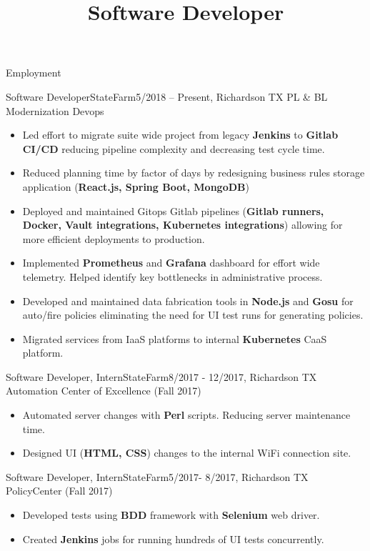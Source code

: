 \documentclass[]{lau}
\title{Software Developer}
\begin{document}
	\makeheader

	\begin{cvsection}{Employment}
		\begin{cvsubsection}{Software Developer}{StateFarm}{5/2018 – Present, Richardson TX}
			PL \& BL Modernization Devops
			\begin{itemize}
				\item Led effort to migrate suite wide project from legacy \textbf{Jenkins} to \textbf{Gitlab CI/CD} reducing pipeline complexity and decreasing test cycle time.
				\item Reduced planning time by factor of days by redesigning business rules storage application (\textbf{React.js, Spring Boot, MongoDB})
				\item Deployed and maintained Gitops Gitlab pipelines (\textbf{Gitlab runners, Docker, Vault integrations, Kubernetes integrations}) allowing for more efficient deployments to production.
				\item Implemented \textbf{Prometheus} and \textbf{Grafana} dashboard for effort wide telemetry. Helped identify key bottlenecks in administrative process.
				\item Developed and maintained data fabrication tools in \textbf{Node.js} and \textbf{Gosu} for auto/fire policies eliminating the need for UI test runs for generating policies.
				\item Migrated services from IaaS platforms to internal \textbf{Kubernetes} CaaS platform.
			\end{itemize}
		\end{cvsubsection}

		\begin{cvsubsection}{Software Developer, Intern}{StateFarm}{8/2017 - 12/2017, Richardson TX}
			Automation Center of Excellence (Fall 2017)
			\begin{itemize}
				\item Automated server changes with \textbf{Perl} scripts. Reducing server maintenance time.
				\item Designed UI (\textbf{HTML, CSS}) changes to the internal WiFi connection site.
			\end{itemize}
		\end{cvsubsection}

		\begin{cvsubsection}{Software Developer, Intern}{StateFarm}{5/2017- 8/2017, Richardson TX}
			PolicyCenter (Fall 2017)
			\begin{itemize}
				\item Developed tests using \textbf{BDD} framework with \textbf{Selenium} web driver.
				\item Created \textbf{Jenkins} jobs for running hundreds of UI tests concurrently.
			\end{itemize}
		\end{cvsubsection}
	\end{cvsection}
\end{document}
